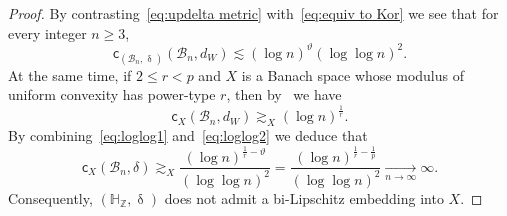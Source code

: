 \documentclass[11pt,reqno]{amsart}
\renewcommand{\H}{\mathbb{H}}
\newcommand{\Z}{\mathbb{Z}}
\newcommand{\cc}{{\mathsf{c}}}
\newcommand{\0}{\mathbf{0}}
\renewcommand{\1}{\mathbf 1}
\renewcommand{\ge}{\geqslant}
\renewcommand{\le}{\leqslant}
\theoremstyle{remark}
\begin{document}
\begin{proof}
By contrasting~\eqref{eq:updelta metric} with~\eqref{eq:equiv to Kor} we see that for every integer $n\ge 3$,
\begin{equation}\label{eq:loglog1}
\cc_{(\mathcal{B}_n,\updelta)}(\mathcal{B}_n,d_W)\lesssim (\log n)^\vartheta(\log\log n)^2.
\end{equation}
At the same time, if $2\le r<p$ and $X$ is a Banach space whose modulus of uniform convexity has power-type $r$, then by~\cite{LafforgueNaor} we have
\begin{equation}\label{eq:loglog2}
\cc_X(\mathcal{B}_n,d_W)\gtrsim_X (\log n)^{\frac{1}{r}}.
\end{equation}
By combining~\eqref{eq:loglog1} and~\eqref{eq:loglog2} we deduce that
$$
\cc_X(\mathcal{B}_n,\delta)\gtrsim_X \frac{(\log n)^{\frac{1}{r}-\vartheta}}{(\log\log n)^2}= \frac{(\log n)^{\frac{1}{r}-\frac{1}{p}}}{(\log\log n)^2}\xrightarrow[n\to \infty]{} \infty.
$$
Consequently, $(\H_\Z,\updelta)$ does not admit a bi-Lipschitz embedding into $X$.


\end{proof}
\end{document}
